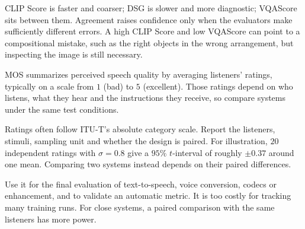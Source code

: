 \metricsecondary

CLIP Score is faster and coarser; DSG is slower and more diagnostic; VQAScore sits between them. Agreement raises confidence only when
the evaluators make sufficiently different errors. A high CLIP Score and low VQAScore can point to a compositional mistake, such as the
right objects in the wrong arrangement, but inspecting the image is still necessary.

\metricend
\clearpage
\thispagestyle{genaistyle}
\label{sec:mos}


MOS summarizes perceived speech quality by averaging listeners' ratings, typically on a scale from $1$ (bad) to $5$ (excellent).
Those ratings depend on who listens, what they hear and the instructions they receive, so compare systems under the same test
conditions.

\begin{metricformula}
\end{metricformula}

Ratings often follow ITU-T's absolute category scale. Report the listeners, stimuli, sampling unit and whether the design is paired. For
illustration, $20$ independent ratings with $\sigma=0.8$ give a $95\%$ $t$-interval of roughly $\pm0.37$ around one mean. Comparing two
systems instead depends on their paired differences.


Use it for the final evaluation of text-to-speech, voice conversion, codecs or enhancement, and to validate an automatic metric. It is
too costly for tracking many training runs. For close systems, a paired comparison with the same listeners has more power.


